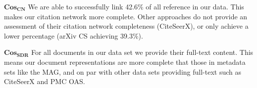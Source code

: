 $\mathbf{Cos_{CN}}$ We are able to successfully link 42.6\% of all reference in our data. This makes our citation network more complete. Other approaches do not provide an assessment of their citation network completeness (CiteSeerX), or only achieve a lower percentage (arXiv CS achieving 39.3\%).

$\mathbf{Cos_{SDR}}$ For all documents in our data set we provide their full-text content. This means our document representations are more complete that those in metadata sets like the MAG, and on par with other data sets providing full-text such as CiteSeerX and PMC OAS. \\








% 


%
%
